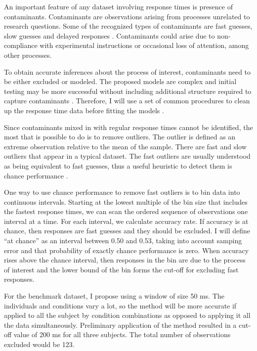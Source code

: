 \documentclass[12pt]{report}
\begin{document}
An important feature of any dataset involving response times is presence of contaminants. Contaminants are observations arising from processes unrelated to research questions. Some of the recognized types of contaminants are fast guesses, slow guesses and delayed responses
\citep{Rat1993,RatTue2002,VanTue2007,VanTue2008,CraPer2010,
VanTue2011}. Contaminants could arise due to non-compliance with experimental instructions or occasional loss of attention, among other processes. 

To obtain accurate inferences about the process of interest, contaminants need to be either excluded or modeled. The proposed models are complex and initial testing may be more successful without including additional structure required to capture contaminants \cite{RatTue2002,CraPer2010}. Therefore, I will use a set of common procedures to clean up the response time data before fitting the models \citep{Rat1993}.

Since contaminants mixed in with regular response times cannot be identified, the most that is possible to do is to remove outliers. The outlier is defined as an extreme observation relative to the mean of the sample. There are fast and slow outliers that appear in a typical dataset. The fast outliers are usually understood as being equivalent to fast guesses, thus a useful heuristic to detect them is chance performance \citep{RatTue2002}.
  
One way to use chance performance to remove fast outliers is to bin data into continuous intervals. Starting at the lowest multiple of the bin size that includes the fastest response times, we can scan the ordered sequence of observations one interval at a time. For each interval, we calculate accuracy rate. If accuracy is at chance, then responses are fast guesses and they should be excluded. I will define ``at chance'' as an interval between 0.50 and 0.53, taking into account samping error and that probability of exactly chance performance is zero. When accuracy rises above the chance interval, then responses in the bin are due to the process of interest and the lower bound of the bin forms the cut-off for excluding fast responses. 

For the benchmark dataset, I propose using a window of size 50 ms. The individuals and conditions vary a lot, so the method will be more accurate if applied to all the subject by condition combinations as opposed to applying it all the data simultaneously. Preliminary application of the method resulted in a cut-off value of 200 ms for all three subjects. The total number of observations excluded would be 123. 
\end{document}
